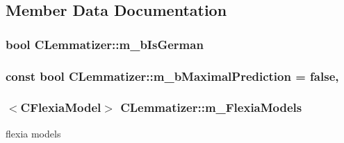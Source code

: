 \subsection{Member Data Documentation}
\hypertarget{classCLemmatizer_aee78b345c6cb1475f6d61f38ed948698}{
\subsubsection[{m\-\_\-b\-Is\-German}]{\setlength{\rightskip}{0pt plus 5cm}bool C\-Lemmatizer\-::m\-\_\-b\-Is\-German\hspace{0.3cm}{\ttfamily [protected]}}}\label{classCLemmatizer_aee78b345c6cb1475f6d61f38ed948698}
\hypertarget{classCLemmatizer_a50a62c695ccd43d736ae590a6650fc22}{
\subsubsection[{m\-\_\-b\-Maximal\-Prediction}]{\setlength{\rightskip}{0pt plus 5cm}const bool C\-Lemmatizer\-::m\-\_\-b\-Maximal\-Prediction = false\hspace{0.3cm}{\ttfamily [static]}, {\ttfamily [protected]}}}\label{classCLemmatizer_a50a62c695ccd43d736ae590a6650fc22}
\hypertarget{classCLemmatizer_a7895fb55ebe69a7aa60c1c0dceb8b04c}{
\subsubsection[{m\-\_\-\-Flexia\-Models}]{$<${\bf C\-Flexia\-Model}$>$ C\-Lemmatizer\-::m\-\_\-\-Flexia\-Models}}\label{classCLemmatizer_a7895fb55ebe69a7aa60c1c0dceb8b04c}


flexia models 

